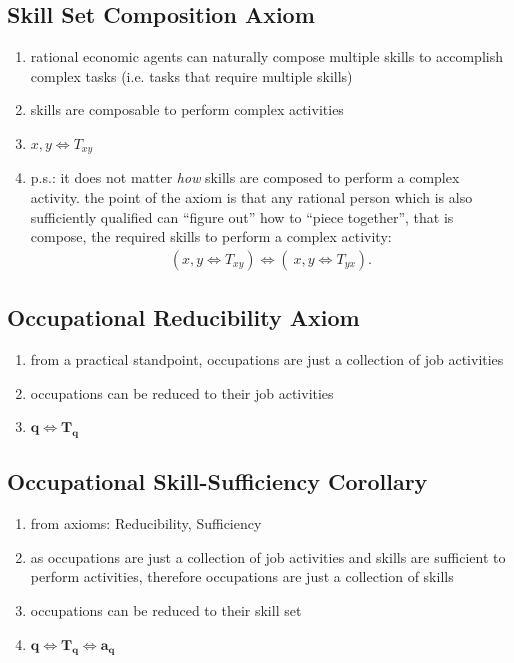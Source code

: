 \documentclass{elsarticle} %
\begin{document}
\subsection{Skill Set Composition Axiom}
\begin{enumerate}
    \item rational economic agents can naturally compose multiple skills to accomplish
          complex tasks (i.e. tasks that require multiple skills)
    \item skills are composable to perform complex activities
    \item $x,y \iff T_{xy}$
    \item p.s.: it does not matter \textit{how} skills are composed to perform a complex
          activity. the point of the axiom is that any rational person which is also
          sufficiently qualified can ``figure out'' how to ``piece together'', that is
          compose, the required skills to perform a complex activity:
          \begin{gather*}
              (x,y \iff T_{xy}) \iff (\ x,y \iff T_{yx})
              .
          \end{gather*}
\end{enumerate}
\subsection{Occupational Reducibility Axiom}
\begin{enumerate}
    \item from a practical standpoint, occupations are just a collection of job
          activities
    \item occupations can be reduced to their job activities
    \item $\boldsymbol{q} \iff \boldsymbol{T_q}$
\end{enumerate}
\subsection{Occupational Skill-Sufficiency Corollary}
\begin{enumerate}
    \item from axioms: Reducibility, Sufficiency
    \item as occupations are just a collection of job activities and skills are
          sufficient to perform activities, therefore occupations are just a collection
          of skills
    \item occupations can be reduced to their skill set
    \item $\boldsymbol{q} \iff \boldsymbol{T_q} \iff \boldsymbol{a_q}$
\end{enumerate}
\end{document}
